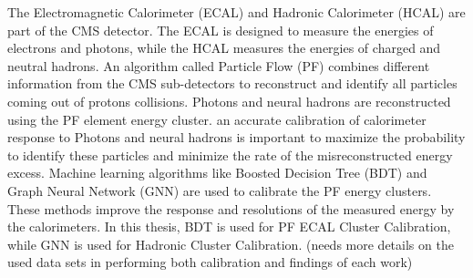

The Electromagnetic Calorimeter (ECAL) and Hadronic Calorimeter (HCAL) are part of the CMS detector. The ECAL is designed to measure the energies of electrons and photons, while the HCAL measures the energies of charged and neutral hadrons.
An algorithm called Particle Flow (PF) combines different information from the CMS sub-detectors to reconstruct and identify all particles coming out of protons collisions. Photons and neural hadrons are reconstructed using the PF element energy cluster.
an accurate calibration of calorimeter response to Photons and neural hadrons is important to maximize the probability to identify these particles and minimize the rate of the misreconstructed energy excess.
Machine learning algorithms like Boosted Decision Tree (BDT) and Graph Neural Network (GNN) are used to calibrate the PF energy clusters.
These methods improve the response and resolutions of the measured energy by the calorimeters.
In this thesis, BDT is used for PF ECAL Cluster Calibration, while GNN is used for Hadronic Cluster Calibration.
(needs more details on the used data sets in performing both calibration and findings of each work) 


